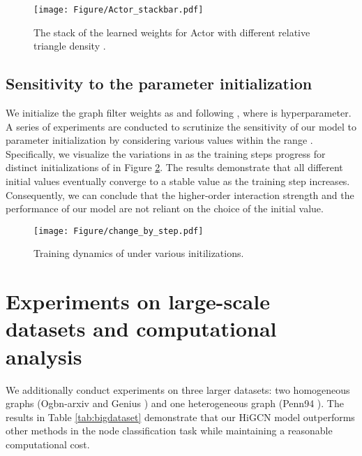 \documentclass[letterpaper]{article} \usepackage{aaai24}
\theoremstyle{plain}
\theoremstyle{definition}
\theoremstyle{remark}
\begin{document}
\begin{figure}[!htbp]
\centering
\texttt{[image: Figure/Actor\_stackbar.pdf]}
\caption{The stack of the learned weights  for Actor with different relative triangle density .}
\label{fig:stackbar_actor}
\end{figure}






\subsection{Sensitivity to the parameter initialization}
\label{appendix:initialize}

We initialize the graph filter weights as   and  following \cite{APPNP}, where  is hyperparameter.
A series of experiments are conducted to scrutinize the sensitivity of our model to parameter initialization by considering various  values within the range . 
Specifically, we visualize the variations in  as the training steps progress for distinct initializations of  in Figure \ref{fig:gammar_change_by_step}. 
The results demonstrate that all different initial values eventually converge to a stable value as the training step increases.
Consequently, we can conclude that the higher-order interaction strength  and the performance of our model are not reliant on the choice of the initial value.


\begin{figure}[!ht]
\centering
\texttt{[image: Figure/change\_by\_step.pdf]}
\caption{Training dynamics of  under various initilizations.}
\label{fig:gammar_change_by_step}
\end{figure}



\section{Experiments on large-scale datasets and computational analysis}
\label{appendix: large}
We additionally conduct experiments on three larger datasets: two homogeneous graphs (Ogbn-arxiv \cite{data:ogbn_arxiv} and Genius \cite{data:genius}) and one heterogeneous graph (Penn94 \cite{data:penn94}). 
The results in Table \ref{tab:bigdataset} demonstrate that our HiGCN model outperforms other methods in the node classification task while maintaining a reasonable computational cost.
\end{document}
